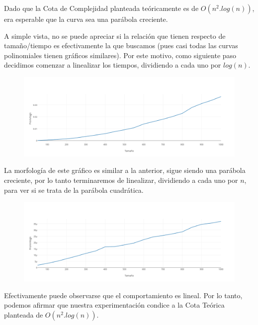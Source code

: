 	Dado que la Cota de Complejidad planteada te\'oricamente es de $O(n^2.log(n))$, era esperable que la curva sea una par\'abola creciente.

	A simple vista, no se puede apreciar si la relaci\'on que tienen respecto de tama\~no/tiempo es efectivamente la que buscamos (pues casi todas las curvas polinomiales tienen gr\'aficos similares). Por este motivo, como siguiente paso decidimos comenzar a linealizar los tiempos, dividiendo a cada uno por $log(n)$.

   \begin{figure}[h!]
   \begin{center}
 	\includegraphics[scale=0.4]{imagenes/ej3/n2.png}
   \end{center}
 \end{figure}

	La morfolog\'ia de este gr\'afico es similar a la anterior, sigue siendo una par\'abola creciente, por lo tanto terminaremos de linealizar, dividiendo a cada uno por $n$, para ver si se trata de la par\'abola cuadr\'atica.\\

   \begin{figure}[h!]
   \begin{center}
 	\includegraphics[scale=0.4]{imagenes/ej3/n.png}
   \end{center}
 \end{figure}

	Efectivamente puede observarse que el comportamiento es lineal. Por lo tanto, podemos afirmar que nuestra experimentaci\'on condice a la Cota Te\'orica planteada de $O(n^2.log(n))$.